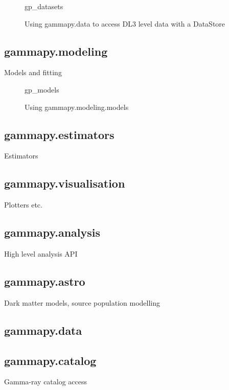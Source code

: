 \begin{figure}

	{gp_datasets}
	\caption{Using gammapy.data to access DL3 level data with a DataStore}
	\label{fig*:minted:gp_datasets}
\end{figure}

\subsection{gammapy.modeling}
\label{ssec:gammapy-modeling}
Models and fitting

\begin{figure}
	{gp_models}
	\caption{Using gammapy.modeling.models}
	\label{fig*:minted:gp_models}
\end{figure}

\subsection{gammapy.estimators}
\label{ssec:gammapy-estimators}
Estimators

\subsection{gammapy.visualisation}
\label{ssec:gammapy-visualisation}
Plotters etc.

\subsection{gammapy.analysis}
\label{ssec:gammapy-analysis}
High level analysis API

\subsection{gammapy.astro}
\label{ssec:gammapy-astro}
Dark matter models, source population modelling

\subsection{gammapy.data}
\label{ssec:gammapy-data}

\subsection{gammapy.catalog}
\label{ssec:gammapy-catalog}
Gamma-ray catalog access

